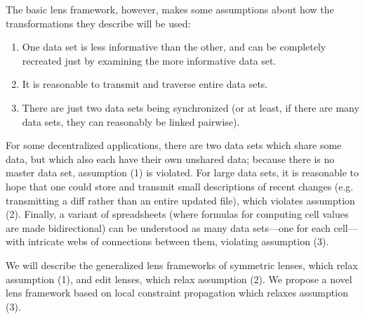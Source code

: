 The basic lens framework, however, makes some assumptions about how the
transformations they describe will be used:
\begin{enumerate}
    \item One data set is less informative than the other, and can be
        completely recreated just by examining the more informative data
        set.
    \item It is reasonable to transmit and traverse entire data sets.
    \item There are just two data sets being synchronized (or at least, if
        there are many data sets, they can reasonably be linked pairwise).
\end{enumerate}
For some decentralized applications, there are two data sets which share
some data, but which also each have their own unshared data; because there
is no master data set, assumption (1) is violated. For large data sets, it
is reasonable to hope that one could store and transmit small descriptions
of recent changes (e.g. transmitting a diff rather than an entire updated
file), which violates assumption (2). Finally, a variant of spreadsheets
(where formulas for computing cell values are made bidirectional) can be
understood as many data sets---one for each cell---with intricate webs of
connections between them, violating assumption (3).

We will describe the generalized lens frameworks of symmetric lenses, which
relax assumption (1), and edit lenses, which relax assumption (2). We
propose a novel lens framework based on local constraint propagation which
relaxes assumption (3).

\vspace*{\fill}

\newpage

\tableofcontents

\newpage
\draftspaced
{}
